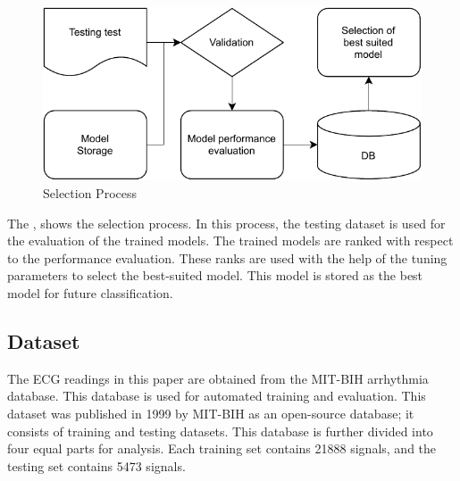 \begin{figure}[ht]
    \centering
    \includegraphics[width=0.7\columnwidth]{media/ch_dataset_and_methods/selector.pdf}
    \caption{Selection Process}
    \label{fig:selection_process}
\end{figure}

The , shows the selection process. In this process, the testing dataset is used for the evaluation of the trained models. The trained models are ranked with respect to the performance evaluation. These ranks are used with the help of the tuning parameters to select the best-suited model. This model is stored as the best model for future classification.

\subsection{Dataset}
The ECG readings in this paper are obtained from the MIT-BIH arrhythmia database. This database is used for automated training and evaluation. This dataset was published in 1999 by MIT-BIH as an open-source database; it consists of training and testing datasets. This database is further divided into four equal parts for analysis. Each training set contains 21888 signals, and the testing set contains 5473 signals.
